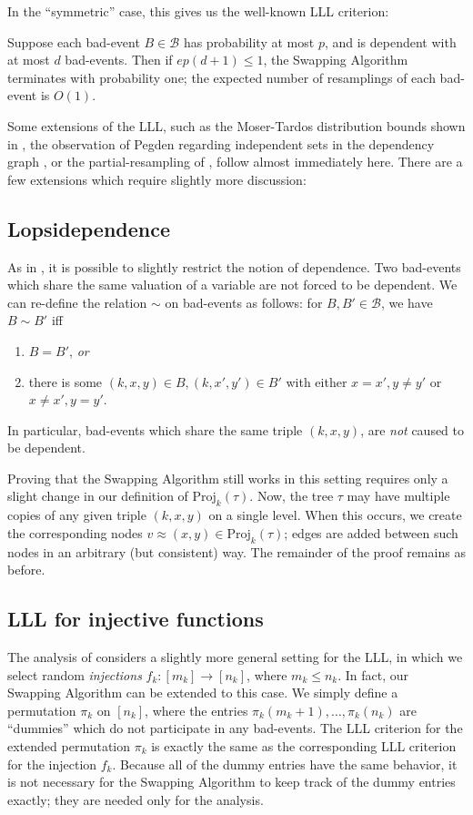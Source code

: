 In the ``symmetric'' case, this gives us the well-known LLL criterion:
\begin{corollary}
Suppose each bad-event $B \in \mathcal B$ has probability at most $p$, and is dependent with at most $d$ bad-events. Then if
$e p (d+1) \leq 1$,
the Swapping Algorithm terminates with probability one; the expected number of resamplings of each bad-event is $O(1)$.
\end{corollary}

Some extensions of the LLL, such as the Moser-Tardos distribution bounds shown in \cite{haeupler}, the observation of Pegden regarding independent sets in the dependency graph \cite{pegden}, or the partial-resampling of \cite{harris-srin2}, follow almost immediately here. There are a few extensions which require slightly more discussion:

\subsection{Lopsidependence}
\label{sec:lopsi}
As in \cite{moser-tardos}, it is possible to slightly restrict the notion of dependence. Two bad-events which share the same valuation of a variable are not forced to be dependent. We can re-define the relation $\sim$ on bad-events as follows: for $B, B' \in \mathcal B$, we have $B \sim B'$ iff
\begin{enumerate}
\item $B = B'$, \emph{or}
\item there is some $(k, x, y) \in B, (k, x', y') \in B'$ with either $x = x', y \neq y'$ or $x \neq x', y = y'$.
\end{enumerate}
In particular, bad-events which share the same triple $(k,x,y)$, are \emph{not} caused to be dependent.

Proving that the Swapping Algorithm still works in this setting requires only a slight change in our definition of $\text{Proj}_k(\tau)$. Now, the tree $\tau$ may have multiple copies of any given triple $(k,x,y)$ on a single level. When this occurs, we create the corresponding nodes $v \approx (x,y) \in \text{Proj}_k(\tau)$; edges are added between such nodes in an arbitrary (but consistent) way. The remainder of the proof remains as before.

\subsection{LLL for injective functions}
\label{sec:injective}
The analysis of \cite{random-inj} considers a slightly more general setting for the LLL, in which we select random \emph{injections} $f_k: [m_k] \rightarrow [n_k]$, where $m_k \leq n_k$. In fact, our Swapping Algorithm can be extended to this case. We simply define a permutation $\pi_k$ on $[n_k]$, where the entries $\pi_k(m_k+1), \dots, \pi_k(n_k)$ are ``dummies'' which do not participate in any bad-events. The LLL criterion for the extended permutation $\pi_k$ is exactly the same as the corresponding LLL criterion for the injection $f_k$. Because all of the dummy entries have the same behavior, it is not necessary for the Swapping Algorithm to keep track of the dummy entries exactly; they are needed only for the analysis.


